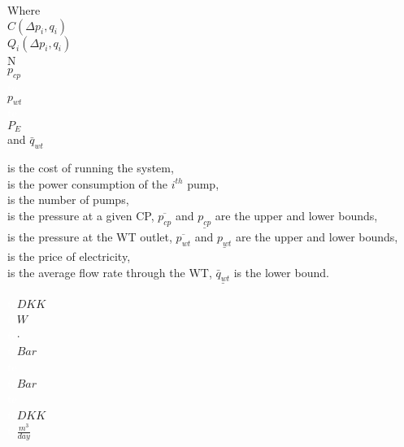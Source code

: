  \begin{minipage}[t]{0.20\textwidth}
 Where\\
 \hspace*{8mm} $C(\Delta{p}_i,q_i)$ \\
 \hspace*{8mm} $Q_i(\Delta{p}_i,q_i)$ \\
 \hspace*{8mm} N \\
 \hspace*{8mm} $p_{cp}$ \\
 \hspace*{8mm}  \textcolor{White}{te}\\
 \hspace*{8mm} $p_{wt}$ \\
 \hspace*{8mm}  \textcolor{White}{te}\\
 \hspace*{8mm} $P_E$ \\
  and \hspace*{0.7mm} $\bar{q}_{wt}$	
 \end{minipage}
 \begin{minipage}[t]{0.68\textwidth}
 \vspace*{2mm}
 is the cost of running the system, \\
 is the power consumption of the $i^{th}$ pump,\\
 is the number of pumps,\\
 is the pressure at a given CP, $\overline{p_{cp}}$ and $\underline{p_{cp}}$ are the upper and lower bounds,\\
 is the pressure at the WT outlet, $\overline{p_{wt}}$ and $\underline{p_{wt}}$ are the upper and lower bounds,\\
 is the price of electricity,\\ 
 is the average flow rate through the WT, $\underline{\bar{q}_{wt}}$ is the lower bound.
 \end{minipage}
 \begin{minipage}[t]{0.10\textwidth}
 \vspace*{2mm}
 \textcolor{White}{te}$\unit{DKK}$\\
 \textcolor{White}{te}$\unit{W}$\\
 \textcolor{White}{te}$\unit{\cdot}$\\
 \textcolor{White}{te}$\unit{Bar}$\\
 \hspace*{8mm}  \textcolor{White}{te}\\
 \textcolor{White}{te}$\unit{Bar}$\\
 \hspace*{8mm}  \textcolor{White}{te}\\
 \textcolor{White}{te}$\unit{DKK}$\\
  \textcolor{White}{te}$\unit{\frac{m^3}{day}}$
 \end{minipage}

